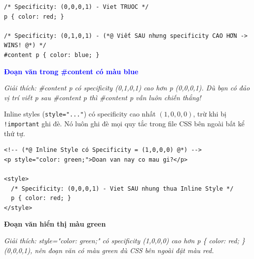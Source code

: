 \documentclass[11pt,oneside]{book}
\newcommand{\codeinline}[1]{\textcolor{accentOrange}{\texttt{#1}}}
\begin{document}
\begin{codeWindow}
\begin{lstlisting}[language=CSS3]
/* Specificity: (0,0,0,1) - Viet TRUOC */
p { color: red; }

/* Specificity: (0,1,0,1) - (*@ Viết SAU nhưng specificity CAO HƠN -> WINS! @*) */
#content p { color: blue; }
\end{lstlisting}
\end{codeWindow}

\begin{browserWindow}
\sffamily\small
\textcolor{blue}{\textbf{Đoạn văn trong \#content có màu blue}} \par\vspace{4pt}
{\scriptsize\textcolor{gray!60}{\textit{Giải thích: \#content p có specificity (0,1,0,1) cao hơn p (0,0,0,1). Dù bạn có đảo vị trí viết p sau \#content p thì \#content p vẫn luôn chiến thắng!}}}
\end{browserWindow}

\begin{warnBox}
Inline styles (\codeinline{style="..."}) có specificity cao nhất $(1,0,0,0)$, trừ khi bị \codeinline{!important} ghi đè. Nó luôn ghi đè mọi quy tắc trong file CSS bên ngoài bất kể thứ tự.
\end{warnBox}

\begin{codeWindow}
\begin{lstlisting}[language=HTML5]
<!-- (*@ Inline Style có Specificity = (1,0,0,0) @*) -->
<p style="color: green;">Doan van nay co mau gi?</p>

<style>
  /* Specificity: (0,0,0,1) - Viet SAU nhung thua Inline Style */
  p { color: red; }
</style>
\end{lstlisting}
\end{codeWindow}

\begin{browserWindow}
\sffamily\small
\textcolor{green!60!black}{\textbf{Đoạn văn hiển thị màu green}} \par\vspace{4pt}
{\scriptsize\textcolor{gray!60}{\textit{Giải thích: style="color: green;" có specificity (1,0,0,0) cao hơn p \{ color: red; \} (0,0,0,1), nên đoạn văn có màu green dù CSS bên ngoài đặt màu red.}}}
\end{browserWindow}
\end{document}
